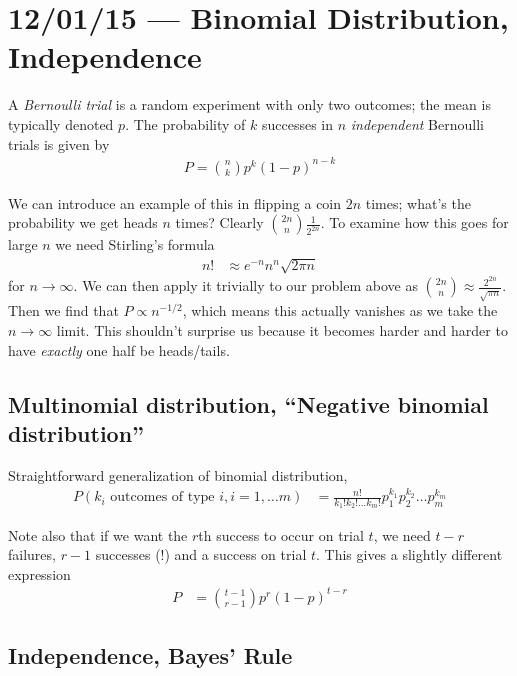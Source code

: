 \documentclass[10pt]{report}
\begin{document}
\chapter{12/01/15 --- Binomial Distribution, Independence}

A \emph{Bernoulli trial} is a random experiment with only two outcomes; the mean is typically denoted $p$. The probability of $k$ successes in $n$ \emph{independent} Bernoulli trials is given by
\begin{align}
    P = \binom{n}{k}p^k \left( 1-p \right)^{n-k}
\end{align}

We can introduce an example of this in flipping a coin $2n$ times; what's the probability we get heads $n$ times? Clearly $\binom{2n}{n}\frac{1}{2^{2n}}$. To examine how this goes for large $n$ we need Stirling's formula
\begin{align}
    n! &\approx e^{-n}n^n \sqrt{2\pi n}
\end{align}
for $n \to \infty$. We can then apply it trivially to our problem above as $\binom{2n}{n} \approx \frac{2^{2n}}{\sqrt{\pi n}}$. Then we find that $P \propto n^{-1/2}$, which means this actually vanishes as we take the $n \to \infty$ limit. This shouldn't surprise us because it becomes harder and harder to have \emph{exactly} one half be heads/tails.

\section{Multinomial distribution, ``Negative binomial distribution''}

Straightforward generalization of binomial distribution,
\begin{align}
    P(k_i \text{ outcomes of type } i, i=1, \dots m) &= \frac{n!}{k_1! k_2! \dots k_m!} p_1^{k_1}p_2^{k_2}\dots p_m^{k_m}
\end{align}

Note also that if we want the $r$th success to occur on trial $t$, we need $t-r$ failures, $r-1$ successes (!) and a success on trial $t$. This gives a slightly different expression
\begin{align}
    P &=\binom{t-1}{r-1} p^r \left( 1-p \right)^{t-r}
\end{align}

\section{Independence, Bayes' Rule}
\end{document}
